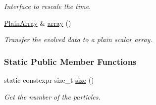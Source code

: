 \begin{DoxyCompactItemize}
\begin{DoxyCompactList}\small\item\em Interface to rescale the time. \end{DoxyCompactList}\item 
\mbox{\hyperlink{class_a_rchain_a829aca51411c08ffd518294770a374d5}{Plain\+Array}} \& \mbox{\hyperlink{class_a_rchain_aeb4d9b0a28ae3b4e4286edf838e5a905}{array}} ()
\begin{DoxyCompactList}\small\item\em Transfer the evolved data to a plain scalar array. \end{DoxyCompactList}\end{DoxyCompactItemize}
\subsubsection*{Static Public Member Functions}
\begin{DoxyCompactItemize}
\item 
static constexpr size\+\_\+t \mbox{\hyperlink{class_a_rchain_ac612af46ce057d56dc47a6d28738a4cf}{size}} ()
\begin{DoxyCompactList}\small\item\em Get the number of the particles. \end{DoxyCompactList}\end{DoxyCompactItemize}
